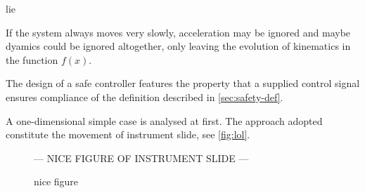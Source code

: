 \gls{lie}

If the system always moves very slowly, acceleration may be ignored and maybe dyamics could be ignored altogether, only leaving the evolution of kinematics in the function $f(x)$.

The design of a safe controller features the property that a supplied control signal ensures compliance of the definition described in \autoref{sec:safety-def}.

A one-dimensional simple case is analysed at first. The approach adopted constitute the movement of instrument slide, see \autoref{fig:lol}.

\begin{figure}[H]
\center
--- NICE FIGURE OF INSTRUMENT SLIDE ---
\caption{nice figure}
\label{fig:lol}
\end{figure}

